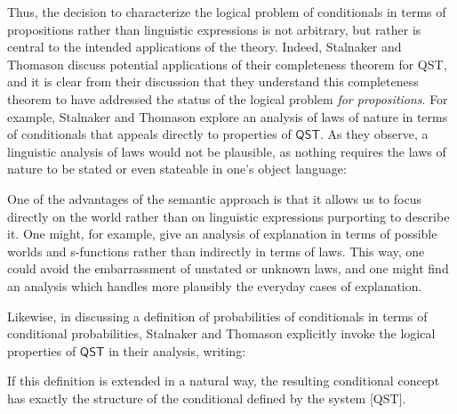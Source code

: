 \documentclass[12pt]{article}
\newcommand{\would}{\mathbin{>}}
\begin{document}
 


Thus, the decision to characterize the logical problem of conditionals in terms of propositions rather than linguistic expressions is not arbitrary, but rather is central to the intended applications of the theory. Indeed, Stalnaker and Thomason discuss potential applications of their completeness theorem for \textsf{QST}, and it is clear from their discussion that they understand this completeness theorem to have addressed the status of the logical problem \emph{for propositions}. 
For example, Stalnaker and Thomason explore an analysis of laws of nature in terms of conditionals that appeals directly to properties of $\mathsf{QST}$. 
As they observe, a linguistic analysis of laws would not be plausible, as nothing requires the laws of nature to be stated or even stateable in one's object language: 
\begin{displayquote}
    One of the advantages of the semantic approach is that it allows us to focus directly on the world rather than on linguistic expressions purporting to describe it. 
    One might, for example, give an analysis of explanation in terms of possible worlds and s-functions rather than indirectly in terms of laws. 
    This way, one could avoid the embarrassment of unstated or unknown laws, and one might find an analysis which handles more plausibly the everyday cases of explanation. \parencite[p.\ 41]{StalnakerThomason1970}
\end{displayquote}
Likewise, in discussing a definition of probabilities of conditionals in terms of conditional probabilities, %
Stalnaker and Thomason explicitly invoke the logical properties of $\mathsf{QST}$ in their analysis, writing:
\begin{displayquote}
    If this definition is extended in a natural way, the resulting conditional concept has exactly the structure of the conditional defined by the system [\textsf{QST}]. 
\parencite[p.\ 41]{StalnakerThomason1970}
\end{displayquote}
\end{document}
